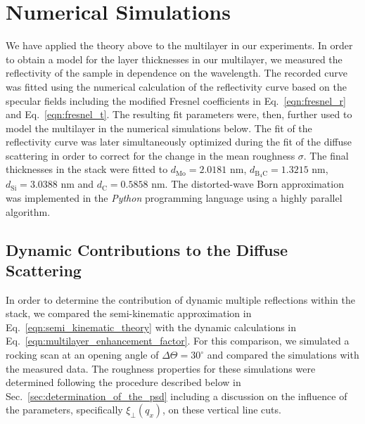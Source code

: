 \documentclass[twocolumn,osajnl,showpacs,superscriptaddress,11pt]{revtex4-1}
\begin{document}
\section{Numerical Simulations} \label{sec:numerical_simulations} We have applied the theory above to the multilayer in our experiments. In order to obtain a model for the layer thicknesses in our multilayer, we measured the reflectivity of the sample in dependence on the wavelength. The recorded curve was fitted using the numerical calculation of the reflectivity curve based on the specular fields including the modified Fresnel coefficients in Eq.~\eqref{eqn:fresnel_r} and Eq.~\eqref{eqn:fresnel_t}. The resulting fit parameters were, then, further used to model the multilayer in the numerical simulations below. The fit of the reflectivity curve was later simultaneously optimized during the fit of the diffuse scattering in order to correct for the change in the mean roughness $\sigma$. The final thicknesses in the stack were fitted to $d_\text{Mo} = 2.0181$ nm, $d_\text{B$_4$C} = 1.3215$ nm, $d_\text{Si} = 3.0388$ nm and $d_\text{C} = 0.5858$ nm. The distorted-wave Born approximation was implemented in the \emph{Python} programming language using a highly parallel algorithm.

\subsection{Dynamic Contributions to the Diffuse Scattering} \label{sec:dynamic_contributions} 
In order to determine the contribution of dynamic multiple reflections within the stack, we compared the semi-kinematic approximation in Eq.~\eqref{eqn:semi_kinematic_theory} with the dynamic calculations in Eq.~\eqref{eqn:multilayer_enhancement_factor}. For this comparison, we simulated a rocking scan at an opening angle of $\Delta \Theta = 30^\circ$ and compared the simulations with the measured data. The roughness properties for these simulations were determined following the procedure described below in Sec.~\ref{sec:determination_of_the_psd} including a discussion on the influence of the parameters, specifically $\xi_\perp(q_x)$, on these vertical line cuts.
\end{document}
